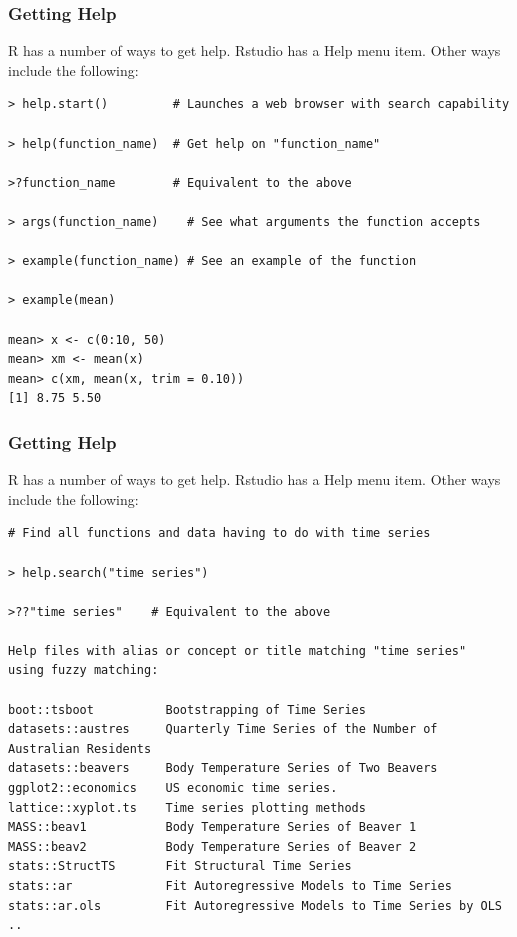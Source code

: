 \documentclass{beamer}
\begin{document}

\begin{frame}[fragile]
\frametitle{Getting Help}
R has a number of ways to get help. Rstudio has a Help menu item. Other ways include the following:
\footnotesize
\begin{verbatim}
> help.start()         # Launches a web browser with search capability

> help(function_name)  # Get help on "function_name"

>?function_name        # Equivalent to the above

> args(function_name)    # See what arguments the function accepts

> example(function_name) # See an example of the function

> example(mean)

mean> x <- c(0:10, 50)
mean> xm <- mean(x)
mean> c(xm, mean(x, trim = 0.10))
[1] 8.75 5.50
\end{verbatim}
\end{frame}



\begin{frame}[fragile]
\frametitle{Getting Help}
R has a number of ways to get help. Rstudio has a Help menu item. Other ways include the following:
\scriptsize
\begin{verbatim}
# Find all functions and data having to do with time series

> help.search("time series") 

>??"time series"    # Equivalent to the above

Help files with alias or concept or title matching "time series" 
using fuzzy matching:

boot::tsboot          Bootstrapping of Time Series
datasets::austres     Quarterly Time Series of the Number of Australian Residents
datasets::beavers     Body Temperature Series of Two Beavers
ggplot2::economics    US economic time series.
lattice::xyplot.ts    Time series plotting methods
MASS::beav1           Body Temperature Series of Beaver 1
MASS::beav2           Body Temperature Series of Beaver 2
stats::StructTS       Fit Structural Time Series
stats::ar             Fit Autoregressive Models to Time Series
stats::ar.ols         Fit Autoregressive Models to Time Series by OLS
..
\end{verbatim}
\end{frame}


\end{document}

